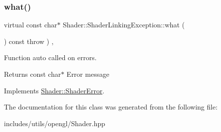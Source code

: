 \subsubsection{\texorpdfstring{what()}{what()}}
{\footnotesize\ttfamily virtual const char$\ast$ Shader\+::\+Shader\+Linking\+Exception\+::what (\begin{DoxyParamCaption}{ }\end{DoxyParamCaption}) const throw  ) \hspace{0.3cm}{\ttfamily [inline]}, {\ttfamily [virtual]}}



Function auto called on errors. 

\begin{DoxyReturn}{Returns}
const char$\ast$ Error message 
\end{DoxyReturn}


Implements \hyperlink{class_shader_1_1_shader_error_aae7a37e1a4590a9347142d236e62372a}{Shader\+::\+Shader\+Error}.



The documentation for this class was generated from the following file\+:\begin{DoxyCompactItemize}
\item 
includes/utils/opengl/Shader.\+hpp\end{DoxyCompactItemize}
